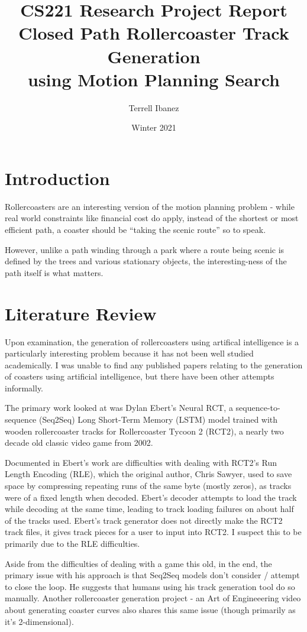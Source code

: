 \documentclass[12pt]{article}
\title{CS221 Research Project Report\\Closed Path Rollercoaster Track Generation\\using Motion Planning Search}
\date{Winter 2021}
\author{Terrell Ibanez}
\begin{document}
\maketitle{}

\section*{Introduction}
Rollercoasters are an interesting version of the motion planning problem - while real world constraints like financial cost do apply, instead of the shortest or most efficient path, a coaster should be ``taking the scenic route'' so to speak.

However, unlike a path winding through a park where a route being scenic is defined by the trees and various stationary objects, the interesting-ness of the path itself is what matters.

\section*{Literature Review}
Upon examination, the generation of rollercoasters using artifical intelligence is a particularly interesting problem because it has not been well studied academically.
I was unable to find any published papers relating to the generation of coasters using artificial intelligence, but there have been other attempts informally.

The primary work looked at was Dylan Ebert's Neural RCT, a sequence-to-sequence (Seq2Seq) Long Short-Term Memory (LSTM) model trained with wooden rollercoaster tracks for Rollercoaster Tycoon 2 (RCT2), a nearly two decade old classic video game from 2002.

Documented in Ebert's work are difficulties with dealing with RCT2's Run Length Encoding (RLE), which the original author, Chris Sawyer, used to save space by compressing repeating runs of the same byte (mostly zeros), as tracks were of a fixed length when decoded.
Ebert's decoder attempts to load the track while decoding at the same time, leading to track loading failures on about half of the tracks used.
Ebert's track generator does not directly make the RCT2 track files, it gives track pieces for a user to input into RCT2.
I suspect this to be primarily due to the RLE difficulties.

Aside from the difficulties of dealing with a game this old, in the end, the primary issue with his approach is that Seq2Seq models don't consider / attempt to close the loop. He suggests that humans using his track generation tool do so manually.
Another rollercoaster generation project - an Art of Engineeering video about generating coaster curves also shares this same issue (though primarily as it's 2-dimensional).
\end{document}
